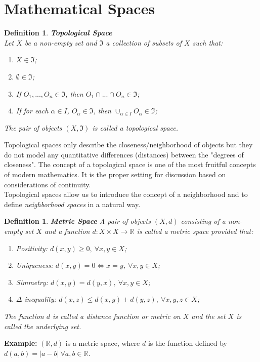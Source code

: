 \documentclass[twoside]{article}
\newtheorem{definition}[theorem]{Definition}
\begin{document}
\section{Mathematical Spaces}
\begin{definition} \textbf{Topological Space} \\
Let $X$ be a non-empty set and $\Im$ a collection of subsets of $X$ such that:
\renewcommand{\theenumi}{\Roman{enumi}}
\begin{enumerate}
    \item $X \in \Im$;
    \item $\emptyset \in \Im$;
    \item If $O_1,...,O_n \in \Im$, then $O_1 \cap... \cap O_n \in \Im$;
    \item If for each $\alpha \in I$, $O_\alpha \in \Im$, then $\cup_{\alpha \in I} O_\alpha \in \Im$;
\end{enumerate}
The pair of objects $(X, \Im)$ is called a topological space.
\end{definition}
Topological spaces only describe the closeness/neighborhood of objects but they do not model any quantitative differences (distances) between the "degrees of closeness". The concept of a topological space is one of the most fruitful concepts of modern mathematics. It is the proper setting for discussion based on considerations of continuity.\\
Topological spaces allow us to introduce the concept of a neighborhood and to define \textit{neighborhood spaces} in a natural way.
\begin{definition} \textbf{Metric Space}
A pair of objects $(X, d)$ consisting of a non-empty set $X$ and a function $d: X \times X \rightarrow \mathbb{R}$ is called a metric space provided that:
\renewcommand{\theenumi}{\Roman{enumi}}
\begin{enumerate}
    \item Positivity: $d(x,y) \geq 0, \: \forall x, y \in X$;
    \item Uniqueness: $d(x,y) = 0 \Leftrightarrow x = y$, \: $\forall x,y \in X$;
    \item Simmetry: $d(x,y) = d(y,x), \: \forall x, y \in X$;
    \item $\Delta$ inequality: $d(x,z) \leq d(x,y) + d(y,z), \: \forall x, y, z \in X$;
\end{enumerate}
The function $d$ is called a distance function or metric on $X$ and the set $X$ is called the underlying set.
\end{definition}
\textbf{Example:} $(\mathbb{R}, d)$ is a metric space, where $d$ is the function defined by $d(a,b) = |a-b| \: \forall a,b \in \mathbb{R}$.
\end{document}
